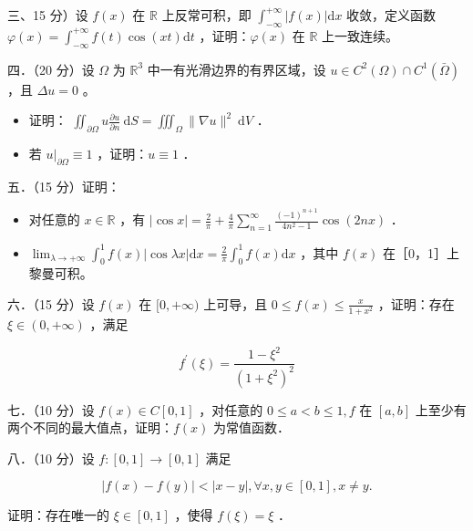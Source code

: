 \documentclass{article}
\begin{document}
三、15 分）设 \(f(x)\) 在 \(\mathbb{R}\) 上反常可积，即 \(\int_{-\infty}^{+\infty}|f(x)| \mathrm{d} x\) 收敛，定义函数 \(\varphi(x)=\int_{-\infty}^{+\infty} f(t) \cos (x t) \mathrm{d} t\) ，证明：\(\varphi(x)\) 在 \(\mathbb{R}\) 上一致连续。

四．（20 分）设 \(\Omega\) 为 \(\mathbb{R}^{3}\) 中一有光滑边界的有界区域，设 \(u \in C^{2}(\Omega) \cap C^{1}(\bar{\Omega})\) ，且 \(\Delta u=0\) 。

\begin{itemize}
  \item[（1）] 证明： \(\iint_{\partial \Omega} u \frac{\partial u}{\partial n} \mathrm{~d} S=\iiint_{\Omega}\|\nabla u\|^{2} \mathrm{~d} V\) ．
  \item[（2）] 若 \(\left.u\right|_{\partial \Omega} \equiv 1\) ，证明：\(u \equiv 1\) ．
\end{itemize}

五．（15 分）证明：

\begin{itemize}
  \item[（1）] 对任意的 \(x \in \mathbb{R}\) ，有 \(|\cos x|=\frac{2}{\pi}+\frac{4}{\pi} \sum_{n=1}^{\infty} \frac{(-1)^{n+1}}{4 n^{2}-1} \cos (2 n x)\) ．
  \item[（2）] \(\lim _{\lambda \rightarrow+\infty} \int_{0}^{1} f(x)|\cos \lambda x| \mathrm{d} x=\frac{2}{\pi} \int_{0}^{1} f(x) \mathrm{d} x\) ，其中 \(f(x)\) 在［0，1］上黎曼可积。
\end{itemize}

六．（15 分）设 \(f(x)\) 在 \([0,+\infty)\) 上可导，且 \(0 \leq f(x) \leq \frac{x}{1+x^{2}}\) ，证明：存在 \(\xi \in(0,+\infty)\) ，满足

\[
f^{\prime}(\xi)=\frac{1-\xi^{2}}{\left(1+\xi^{2}\right)^{2}}
\]

七．（10 分）设 \(f(x) \in C[0,1]\) ，对任意的 \(0 \leq a<b \leq 1, f\) 在 \([a, b]\) 上至少有两个不同的最大值点，证明：\(f(x)\) 为常值函数．

八．（10 分）设 \(f:[0,1] \rightarrow[0,1]\) 满足

\[
|f(x)-f(y)|<|x-y|, \forall x, y \in[0,1], x \neq y .
\]

证明：存在唯一的 \(\xi \in[0,1]\) ，使得 \(f(\xi)=\xi\) ．
\end{document}
